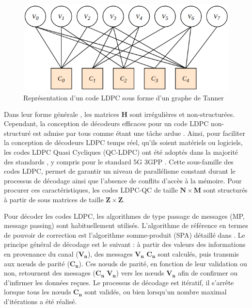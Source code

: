 \documentclass[../main.tex]{subfiles}
\begin{document}
\begin{figure}
    \centering
    \includegraphics[scale=0.5]{chapter2/figs/tanner.png}
    \caption{Représentation d’un code LDPC sous forme d’un graphe de Tanner}
    \label{Tanner}
\end{figure}

Dans leur forme générale  \cite{Gallager62,LDPC2}, les matrices \textbf{H} sont irrégulières et non-structurées. Cependant, la conception de décodeurs efficaces pour un code LDPC non-structuré est admise par tous comme étant une tâche ardue \cite{NISC:BLG}. Ainsi, pour faciliter la conception de décodeurs LDPC temps réel, qu’ils soient matériels ou logiciels, les codes LDPC Quasi Cycliques (QC-LDPC) ont été adoptés dans la majorité des standards \cite{wifi, wimax, wlan, verizon}, y compris pour le standard 5G 3GPP  \cite{5g}. Cette sous-famille des codes LDPC, permet de garantir un niveau de parallélisme constant durant le processus de décodage ainsi que l’absence de conflits d’accès à la mémoire. Pour procurer ces caractéristiques, les codes LDPC-QC \cite{QC:LDPC} de taille $\bm{N \times M}$ sont structurés à partir de sous matrices de taille $\bm{Z \times Z}$.


Pour décoder les codes LDPC, les algorithmes de type passage de messages (MP, message passing) sont habituellement utilisés. L’algorithme de référence en termes de pouvoir de correction est l’algorithme somme-produit (SPA) détaillé dans \cite{LDPC:SPA}. Le principe général de décodage est le suivant : à partir des valeurs des informations en provenance du canal ($\bm{V_n}$), des messages $\bm{V_n}$  \rightarrow $\bm{C_n}$ sont calculés, puis transmis aux nœuds de parité ($\bm{C_n}$). Ces nœuds de parité, en fonction de leur validation ou non, retournent des messages ($\bm{C_n}$ \rightarrow $\bm{V_n}$) vers les nœuds $\bm{V_n}$ afin de confirmer ou d’infirmer les données reçues. Le processus de décodage est itératif, il s’arrête lorsque tous les nœuds $\bm{C_n}$ sont validés, ou bien lorsqu’un nombre maximal d’itérations a été réalisé.
\end{document}
